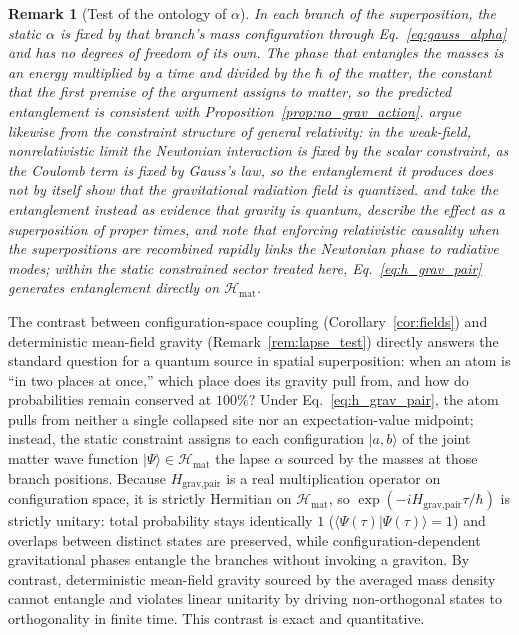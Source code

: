 \documentclass[aps,prd,onecolumn,tightenlines,nofootinbib,notitlepage,11pt,floatfix]{revtex4-2}
\theoremstyle{indentedtheorem}
\newtheorem{remark}{Remark}
\begin{document}
\begin{remark}[Test of the ontology of $\alpha$]
In each branch of the superposition, the static $\alpha$ is fixed by that branch's mass configuration through Eq.~\eqref{eq:gauss_alpha} and has no degrees of freedom of its own. The phase that entangles the masses is an energy multiplied by a time and divided by the $\hbar$ of the matter, the constant that the first premise of the argument assigns to matter, so the predicted entanglement is consistent with Proposition~\ref{prop:no_grav_action}. \citet{Anastopoulos2018Comment} argue likewise from the constraint structure of general relativity: in the weak-field, nonrelativistic limit the Newtonian interaction is fixed by the scalar constraint, as the Coulomb term is fixed by Gauss's law, so the entanglement it produces does not by itself show that the gravitational radiation field is quantized. \citet{Bose2017Spin} and \citet{Marletto2017Gravitationally} take the entanglement instead as evidence that gravity is quantum, \citet{Christodoulou2019Possibility} describe the effect as a superposition of proper times, and \citet{DanielsonSatishchandranWald2022} note that enforcing relativistic causality when the superpositions are recombined rapidly links the Newtonian phase to radiative modes; within the static constrained sector treated here, Eq.~\eqref{eq:h_grav_pair} generates entanglement directly on $\mathcal{H}_\text{mat}$.
\end{remark}

The contrast between configuration-space coupling (Corollary~\ref{cor:fields}) and deterministic mean-field gravity (Remark~\ref{rem:lapse_test}) directly answers the standard question for a quantum source in spatial superposition: when an atom is ``in two places at once,'' which place does its gravity pull from, and how do probabilities remain conserved at $100\%$? Under Eq.~\eqref{eq:h_grav_pair}, the atom pulls from neither a single collapsed site nor an expectation-value midpoint; instead, the static constraint assigns to each configuration $|a,b\rangle$ of the joint matter wave function $|\Psi\rangle\in\mathcal{H}_\text{mat}$ the lapse $\alpha$ sourced by the masses at those branch positions. Because $H_\text{grav,pair}$ is a real multiplication operator on configuration space, it is strictly Hermitian on $\mathcal{H}_\text{mat}$, so $\exp(-i H_\text{grav,pair}\tau/\hbar)$ is strictly unitary: total probability stays identically $1$ ($\langle\Psi(\tau)|\Psi(\tau)\rangle=1$) and overlaps between distinct states are preserved, while configuration-dependent gravitational phases entangle the branches without invoking a graviton. By contrast, deterministic mean-field gravity sourced by the averaged mass density cannot entangle and violates linear unitarity by driving non-orthogonal states to orthogonality in finite time. This contrast is exact and quantitative.
\end{document}
